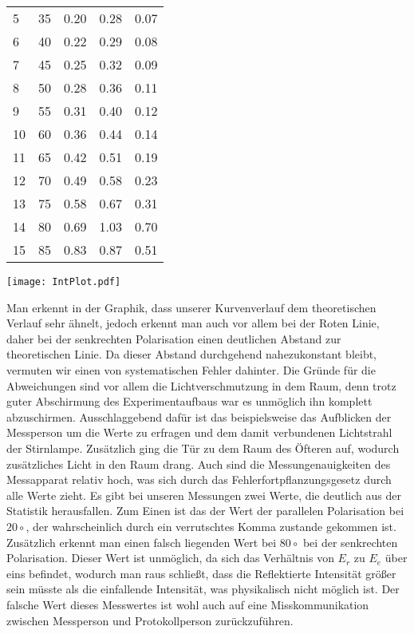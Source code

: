\begin{center}
\begin{tabular}{l | c c c c}
        5  & 35 & 0.20 & 0.28 & 0.07 \\
        6  & 40 & 0.22 & 0.29 & 0.08 \\
        7  & 45 & 0.25 & 0.32 & 0.09 \\
        8  & 50 & 0.28 & 0.36 & 0.11 \\
        9  & 55 & 0.31 & 0.40 & 0.12 \\
        10 & 60 & 0.36 & 0.44 & 0.14 \\
        11 & 65 & 0.42 & 0.51 & 0.19 \\
        12 & 70 & 0.49 & 0.58 & 0.23 \\
        13 & 75 & 0.58 & 0.67 & 0.31 \\
        14 & 80 & 0.69 & 1.03 & 0.70 \\
        15 & 85 & 0.83 & 0.87 & 0.51 \\
    \end{tabular}
    \texttt{[image: IntPlot.pdf]}
\end{center}
Man erkennt in der Graphik, dass unserer Kurvenverlauf dem theoretischen Verlauf sehr ähnelt, jedoch erkennt man auch vor allem bei der Roten Linie, daher bei der senkrechten Polarisation einen deutlichen Abstand zur theoretischen Linie. Da dieser Abstand durchgehend nahezukonstant bleibt, vermuten wir einen von systematischen Fehler dahinter.  Die Gründe für die Abweichungen sind vor allem die Lichtverschmutzung in dem Raum, denn trotz guter Abschirmung des Experimentaufbaus war es unmöglich ihn komplett abzuschirmen. Ausschlaggebend dafür ist das beispielsweise das Aufblicken der Messperson um die Werte zu erfragen und dem damit verbundenen Lichtstrahl der Stirnlampe. Zusätzlich ging die Tür zu dem Raum des Öfteren auf, wodurch zusätzliches Licht in den Raum drang.  Auch sind die Messungenauigkeiten des Messapparat relativ hoch, was sich durch das Fehlerfortpflanzungsgesetz durch alle Werte zieht. 
Es gibt bei unseren Messungen zwei Werte, die deutlich aus der Statistik herausfallen. Zum Einen ist das der Wert der parallelen Polarisation bei $20 \circ$, der wahrscheinlich durch ein verrutschtes Komma zustande gekommen ist. Zusätzlich erkennt man einen falsch liegenden Wert bei $80\circ$ bei der senkrechten Polarisation. Dieser Wert ist unmöglich, da sich das Verhältnis von $E_r$ zu $E_e$ über eins befindet, wodurch man raus schließt, dass die Reflektierte Intensität größer sein müsste als die einfallende Intensität, was physikalisch nicht möglich ist. Der falsche Wert dieses Messwertes ist wohl auch auf eine Misskommunikation zwischen Messperson und Protokollperson zurückzuführen.